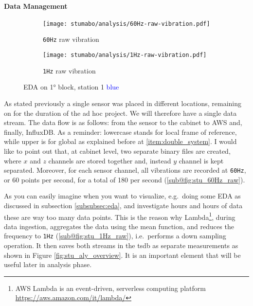 \paragraph{Data Management}
\begin{figure}[ht]
    \begin{subfigure}{.495\textwidth}
        \texttt{[image: stumabo/analysis/60Hz-raw-vibration.pdf]}
        \caption{\texttt{60Hz} raw vibration}
        \label{fig:stu_60Hz_raw}
    \end{subfigure}
    \begin{subfigure}{.495\textwidth}
        \texttt{[image: stumabo/analysis/1Hz-raw-vibration.pdf]}
        \caption{\texttt{1Hz} raw vibration}
        \label{fig:stu_1Hz_raw}
    \end{subfigure}
    \caption{\acl{EDA} on 1° block, station 1 \textcolor{blue}{blue}}
    \label{fig:stu_2_raw_data}
\end{figure}
As stated previously a single sensor was placed in different locations, remaining on for the duration of the ad hoc project. We will therefore have a single data stream.
The data flow is as follows: from the sensor to the cabinet to AWS and, finally, InfluxDB.
As a reminder: lowercase stands for local frame of reference, while upper is for global as explained before at \ref{item:double_system}.
I would like to point out that, at cabinet level, two separate binary files are created, where $x$ and $z$ channels are stored together and, instead $y$ channel is kept separated. 
Moreover, for each sensor channel, all vibrations are recorded at \texttt{60Hz}, or 60 points per second, for a total of 180 per second (\ref{sub@fig:stu_60Hz_raw}).

As you can easily imagine when you want to visualize, e.g.\ doing some \ac{EDA} as discussed in subsection \ref{subsubsec:eda}, 
and investigate hours and hours of data these are way too many data points.
This is the reason why Lambda\footnote{AWS Lambda is an event-driven, serverless computing platform \url{https://aws.amazon.com/it/lambda/}}, 
during data ingestion, aggregates the data using the mean function, and reduces the frequency to \texttt{1Hz} (\ref{sub@fig:stu_1Hz_raw}), i.e.\ 
performs a down sampling operation. It then saves both streams in the \ac{tsdb} as separate measurements as shown in Figure \ref{fig:stu_aly_overview}. 
It is an important element that will be useful later in analysis phase.

